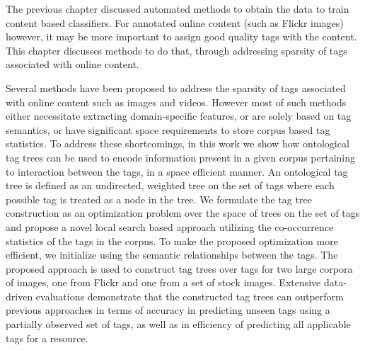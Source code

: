 
The previous chapter discussed automated methods to obtain the data to train content based classifiers. For annotated online content (such as Flickr images) however, it may be more important to assign good quality tags with the content. This chapter discusses methods to do that, through addressing sparsity of tags associated with online content. 


Several methods have been proposed to address the sparsity of tags associated with online content such as images and videos. However most of such methods either necessitate extracting domain-specific features, or are solely based on tag semantics, or have significant space requirements to store corpus based tag statistics. To address these shortcomings, in this work we show how ontological tag trees can be used to encode information present in a given corpus pertaining to interaction between the tags, in a space efficient manner. An ontological tag tree is defined as an undirected, weighted tree on the set of tags where each possible tag is treated as a node in the tree. We formulate the tag tree construction as an optimization problem over the space of trees on the set of tags and propose a novel local search based approach utilizing the co-occurrence statistics of the tags in the corpus. To make the proposed optimization more efficient, we initialize using the semantic relationships between the tags. The proposed approach is used to construct tag trees over tags for two large corpora of images, one from Flickr and one from a set of stock images. Extensive data-driven evaluations demonstrate that the constructed tag trees can outperform previous approaches in terms of accuracy in predicting unseen tags using a partially observed set of tags, as well as in efficiency of predicting all applicable tags for a resource. 









